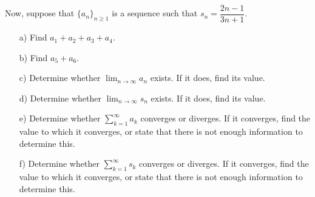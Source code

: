 \documentclass[12pt]{article}
\begin{document}
Now, suppose that $\{a_n\}_{n \geq 1}$ is a sequence such that $s_n = \dfrac{2n-1}{3n+1}$.  

\begin{itemize}
\item[a)] Find $a_1+a_2+a_3+a_4$.
\item[b)] Find $a_5+a_6$.
\item[c)] Determine whether $\displaystyle \lim_{n \rightarrow \infty} a_n$ exists.  If it does, find its value.
\item[d)]  Determine whether $\displaystyle \lim_{n \rightarrow \infty} s_n$ exists.  If it does, find its value.
\item[e)] Determine whether $\displaystyle \sum_{k=1}^{\infty} a_k$ converges or diverges.  If it converges, find the value to which it converges, or state that there is not enough information to determine this.
\item[f)] Determine whether $\displaystyle \sum_{k=1}^{\infty} s_k$ converges or diverges.  If it converges, find the value to which it converges, or state that there is not enough information to determine this.

\end{itemize}
\end{document}
